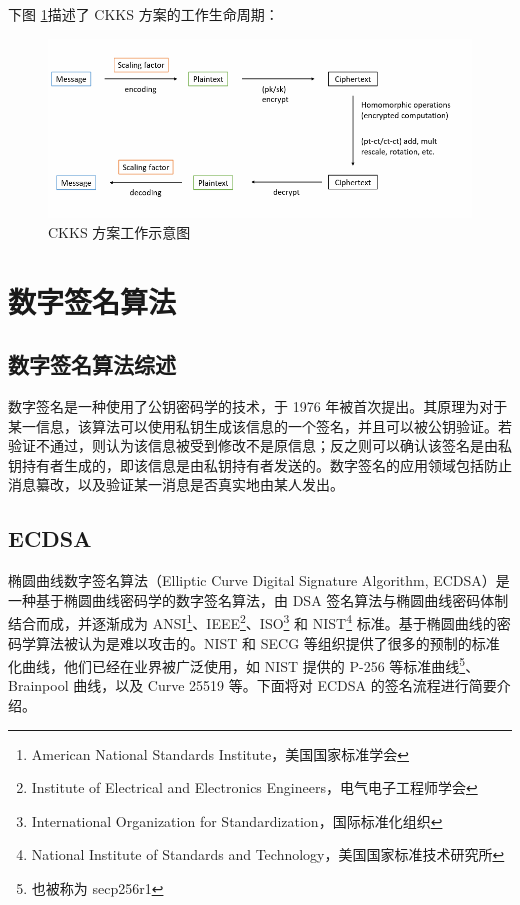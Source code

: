 下图\cite{ckksIntroduct} \ref*{Fig:CKKS}描述了 CKKS 方案的工作生命周期：

\begin{figure}[ht]
    \centering
    \includegraphics[width=0.8\linewidth]{./Figures/CKKS_Diagram.png}
    \caption{CKKS 方案工作示意图}\label{Fig:CKKS}
\end{figure}

\section{数字签名算法}

\subsection{数字签名算法综述}

数字签名是一种使用了公钥密码学的技术，于 1976 年被首次提出\cite{1055638}。其原理为对于某一信息，该算法可以使用私钥生成该信息的一个签名，并且可以被公钥验证。若验证不通过，则认为该信息被受到修改不是原信息；反之则可以确认该签名是由私钥持有者生成的，即该信息是由私钥持有者发送的。数字签名的应用领域包括防止消息纂改，以及验证某一消息是否真实地由某人发出。

\subsection{ECDSA} \label{sec:ecdsa}

椭圆曲线数字签名算法（Elliptic Curve Digital Signature Algorithm, ECDSA）是一种基于椭圆曲线密码学的数字签名算法，由 DSA 签名算法与椭圆曲线密码体制结合而成，并逐渐成为 ANSI\footnote{American National Standards Institute，美国国家标准学会}、IEEE\footnote{Institute of Electrical and Electronics Engineers，电气电子工程师学会}、ISO\footnote{International Organization for Standardization，国际标准化组织} 和 NIST\footnote{National Institute of Standards and Technology，美国国家标准技术研究所} 标准\cite{ecdsa_blockchain}。基于椭圆曲线的密码学算法被认为是难以攻击的。NIST 和 SECG 等组织提供了很多的预制的标准化曲线，他们已经在业界被广泛使用，如 NIST 提供的 P-256 等标准曲线\footnote{也被称为 secp256r1}、Brainpool 曲线，以及 Curve 25519\cite{10.1007/11745853_14} 等。下面将对 ECDSA 的签名流程进行简要介绍。

